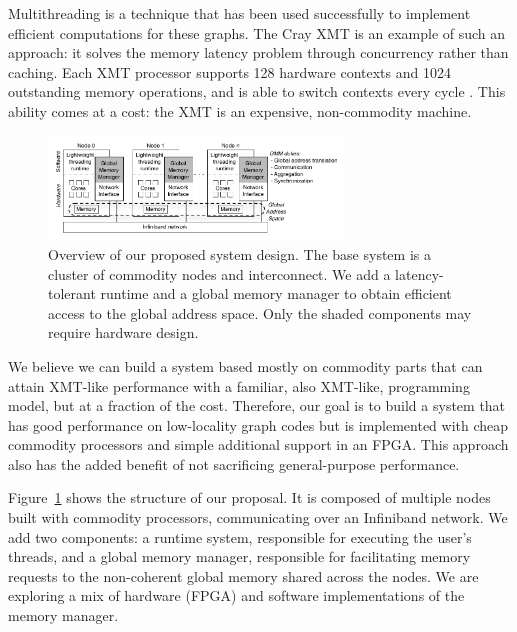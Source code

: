 \documentclass[10pt,nocopyrightspace,preprint]{sigplanconf}
\begin{document}
Multithreading is a technique that has been used successfully to
implement efficient computations for these graphs. The Cray XMT is an
example of such an approach: it solves the memory latency problem
through concurrency rather than caching. Each XMT processor supports
128 hardware contexts and 1024 outstanding memory operations, and is
able to switch contexts every cycle \cite{tera, feo-xmt}. This ability
comes at a cost: the XMT is an expensive, non-commodity
machine.

\begin{figure}[htbp]
  \begin{center}
    \vspace{-0.25in}
    \includegraphics[width=0.7\textwidth]{figures/system-overview.pdf}
    \vspace{-0.1in}
	\end{center}
	\caption{Overview of our proposed system design. The base
          system is a cluster of commodity nodes and interconnect. We
          add a latency-tolerant runtime and a global memory manager
          to obtain efficient access to the global address space. Only
          the shaded components may require hardware design.}
	\label{fig:system-overview}
\end{figure}


We believe we can build a system based mostly on commodity parts that
can attain XMT-like performance with a familiar, also XMT-like,
programming model, but at a fraction of the cost. Therefore, our goal
is to build a system that has good performance on low-locality graph
codes but is implemented with cheap commodity processors and simple
additional support in an FPGA. This approach also has the added
benefit of not sacrificing general-purpose performance.

Figure~\ref{fig:system-overview} shows the structure of our
proposal. It is composed of multiple nodes built with commodity
processors, communicating over an Infiniband network. We add two
components: a runtime system, responsible for executing the user's
threads, and a global memory manager, responsible for facilitating
memory requests to the non-coherent global memory shared across the
nodes.  We are exploring a mix of hardware (FPGA) and software
implementations of the memory manager.
 
\end{document}
